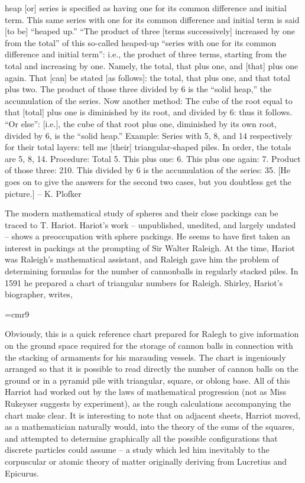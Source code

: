 { {\narrower
    [This] heap [or] series is specified as having one for its common
 difference and initial term. This same series with one for its common
 difference and initial term is said [to be] ``heaped up.'' ``The
 product of three [terms successively] increased by one from the total''
 of this so-called heaped-up ``series with one for its common
 difference and initial term'': i.e., the product of three terms, starting
 from the total and increasing by one. Namely, the total, that plus one,
 and [that] plus one again. That [can] be stated [as follows]: the total,
 that plus one, and that total plus two. The product of those three
 divided by 6 is the ``solid heap,'' the accumulation of the series.
 Now another method: The cube of the root equal to that [total] plus
 one is diminished by its root, and divided by 6: thus it follows.
 ``Or else'': [i.e.], the cube of that root plus one, diminished by
 its own root, divided by 6, is the ``solid heap.''
    Example: Series with 5, 8, and 14 respectively for their total layers:
 tell me [their] triangular-shaped piles.
    In order, the totals are 5, 8, 14.
    Procedure: Total 5. This plus one: 6. This plus one again: 7. Product
 of those three: 210. This divided by 6 is the accumulation of the series:
 35.
    [He goes on to give the answers for the second two cases, but you
 doubtless get the picture.]   --  K. Plofker
 }


}



The modern mathematical study of spheres and their close packings can be
traced to T. Hariot.  Hariot's work -- unpublished, unedited,
and largely undated -- shows a preoccupation with sphere packings.
He seems to have first taken an interest in packings at the
prompting of Sir Walter Raleigh.  At the time, Hariot was Raleigh's
mathematical assistant,  and Raleigh gave him the problem of determining
formulas for the number of cannonballs in regularly stacked piles.
In 1591 he prepared a chart of triangular numbers for Raleigh.
Shirley, Hariot's biographer, writes,

{
\narrower
\font\ninerm=cmr9
\ninerm

    Obviously, this is a quick reference chart prepared for Ralegh to give information on the ground space required for the storage of cannon
    balls in connection with the stacking of armaments for his marauding vessels. The chart is ingeniously arranged so that it is possible to
    read directly the number of cannon balls on the ground or in a pyramid pile with triangular, square, or oblong base. All of this Harriot had
    worked out by the laws of mathematical progression (not as Miss Rukeyser suggests by experiment), as the rough calculations
    accompanying the chart make clear. It is interesting to note that on adjacent sheets, Harriot moved, as a mathematician naturally would,
    into the theory of the sums of the squares, and attempted to determine graphically all the possible configurations that discrete particles
    could assume -- a study which led him inevitably to the corpuscular or atomic theory of matter originally deriving from Lucretius and
    Epicurus. \cite[p.242]{Shi83}

}

